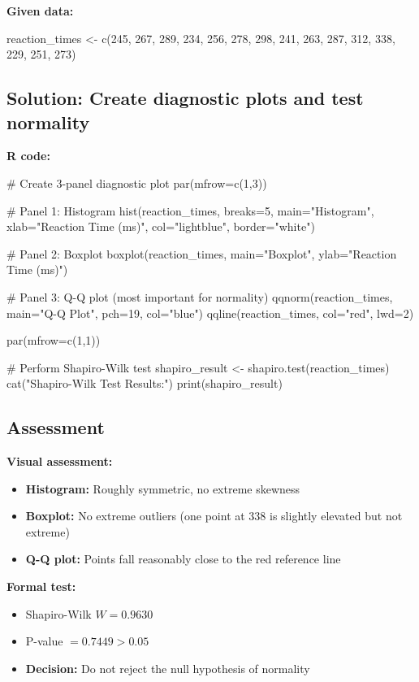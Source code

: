 \documentclass[11pt]{article}
\begin{document}
\textbf{Given data:}
\begin{rcode}
reaction_times <- c(245, 267, 289, 234, 256, 278, 298, 241,
                    263, 287, 312, 338, 229, 251, 273)
\end{rcode}

\subsection*{Solution: Create diagnostic plots and test normality}

\textbf{R code:}
\begin{rcode}
# Create 3-panel diagnostic plot
par(mfrow=c(1,3))

# Panel 1: Histogram
hist(reaction_times, breaks=5, main="Histogram",
     xlab="Reaction Time (ms)", col="lightblue", border="white")

# Panel 2: Boxplot
boxplot(reaction_times, main="Boxplot", ylab="Reaction Time (ms)")

# Panel 3: Q-Q plot (most important for normality)
qqnorm(reaction_times, main="Q-Q Plot", pch=19, col="blue")
qqline(reaction_times, col="red", lwd=2)

par(mfrow=c(1,1))

# Perform Shapiro-Wilk test
shapiro_result <- shapiro.test(reaction_times)
cat("Shapiro-Wilk Test Results:\n")
print(shapiro_result)
\end{rcode}

\subsection*{Assessment}

\textbf{Visual assessment:}
\begin{itemize}
\item \textbf{Histogram:} Roughly symmetric, no extreme skewness
\item \textbf{Boxplot:} No extreme outliers (one point at 338 is slightly elevated but not extreme)
\item \textbf{Q-Q plot:} Points fall reasonably close to the red reference line
\end{itemize}

\textbf{Formal test:}
\begin{itemize}
\item Shapiro-Wilk $W = 0.9630$
\item P-value $= 0.7449 > 0.05$
\item \textbf{Decision:} Do not reject the null hypothesis of normality
\end{itemize}
\end{document}
